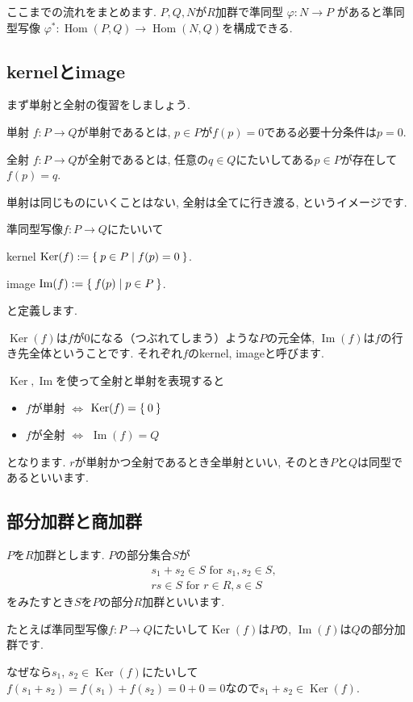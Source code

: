 \documentclass{jsarticle}
\newcommand{\makeop}[1]{\mathop{\mathrm{#1}}\nolimits}
\def\Im{\makeop{Im}}
\def\Ker{\makeop{Ker}}
\def\Hom{\makeop{Hom}}
\theoremstyle{definition}
\newcommand{\mydescription}[1]{
\begin{description}
\setlength{\itemindent}{2zw}
\setlength{\leftskip}{-2zw}
\setlength{\labelsep}{1zw}
#1
\end{description}
}
\numberwithin{theorem}{section}
\begin{document}
ここまでの流れをまとめます. $P, Q, N$が$R$加群で準同型 $\varphi: N \rightarrow P$ があると準同型写像
$\varphi^*: \Hom(P, Q) \rightarrow \Hom(N, Q)$を構成できる.

\subsection{kernelとimage}
まず単射と全射の復習をしましょう.
\mydescription{
\item[単射] $f: P \rightarrow Q$が単射であるとは, $p \in P$が$f(p) = 0$である必要十分条件は$p = 0$.
\item[全射] $f: P \rightarrow Q$が全射であるとは, 任意の$q\in Q$にたいしてある$p\in P$が存在して$f(p) = q$.
}
単射は同じものにいくことはない, 全射は全てに行き渡る, というイメージです.

準同型写像$f: P \rightarrow Q$にたいいて
\mydescription{
\item[kernel] $\Ker(f) := \Set{p \in P | f(p) = 0}$.
\item[image] $\Im(f) := \Set{f(p) | p\in P}$.
}
と定義します.

$\Ker(f)$は$f$が0になる（つぶれてしまう）ような$P$の元全体, $\Im(f)$は$f$の行き先全体ということです.
それぞれ$f$のkernel, imageと呼びます.

$\Ker, \Im$を使って全射と単射を表現すると
\begin{itemize}
\item $f$が単射 $\Leftrightarrow$ $\Ker(f) = \Set{0}$
\item $f$が全射 $\Leftrightarrow$ $\Im(f) = Q$
\end{itemize}
となります. $r$が単射かつ全射であるとき全単射といい, そのとき$P$と$Q$は同型であるといいます.

\subsection{部分加群と商加群}
$P$を$R$加群とします. $P$の部分集合$S$が
\begin{align*}
& s_1 + s_2 \in S \text{ for } s_1, s_2 \in S,\\
& rs \in S \text{ for } r \in R, s \in S
\end{align*}
をみたすとき$S$を$P$の部分$R$加群といいます.

たとえば準同型写像$f:P \rightarrow Q$にたいして$\Ker(f)$は$P$の, $\Im(f)$は$Q$の部分加群です.

なぜなら$s_1$, $s_2 \in \Ker(f)$にたいして$f(s_1+s_2)=f(s_1)+f(s_2)=0+0=0$なので$s_1+s_2 \in \Ker(f)$.
\end{document}
